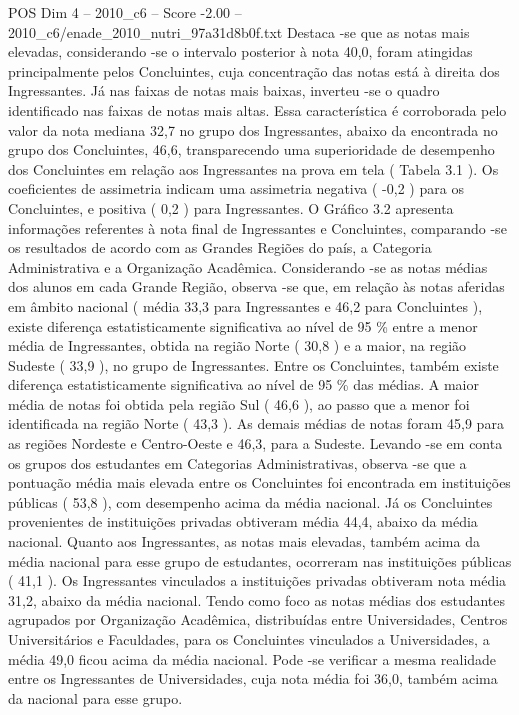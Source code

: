 \begin{textsample}{POS Dim 4 – 2010\_c6 – Score -2.00 – 2010\_c6/enade\_2010\_nutri\_97a31d8b0f.txt}
Destaca -se que as notas mais elevadas, considerando -se o intervalo posterior à nota 40,0, foram atingidas principalmente pelos Concluintes, cuja concentração das notas está à direita dos Ingressantes.
Já nas faixas de notas mais baixas, inverteu -se o quadro identificado nas faixas de notas mais altas.
Essa característica é corroborada pelo valor da nota mediana 32,7 no grupo dos Ingressantes, abaixo da encontrada no grupo dos Concluintes, 46,6, transparecendo uma superioridade de desempenho dos Concluintes em relação aos Ingressantes na prova em tela ( Tabela 3.1 ).
Os coeficientes de assimetria indicam uma assimetria negativa ( -0,2 ) para os Concluintes, e positiva ( 0,2 ) para Ingressantes.
O Gráfico 3.2 apresenta informações referentes à nota final de Ingressantes e Concluintes, comparando -se os resultados de acordo com as Grandes Regiões do país, a Categoria Administrativa e a Organização Acadêmica.
Considerando -se as notas médias dos alunos em cada Grande Região, observa -se que, em relação às notas aferidas em âmbito nacional ( média 33,3 para Ingressantes e 46,2 para Concluintes ), existe diferença estatisticamente significativa ao nível de 95 \% entre a menor média de Ingressantes, obtida na região Norte ( 30,8 ) e a maior, na região Sudeste ( 33,9 ), no grupo de Ingressantes.
Entre os Concluintes, também existe diferença estatisticamente significativa ao nível de 95 \% das médias.
A maior média de notas foi obtida pela região Sul ( 46,6 ), ao passo que a menor foi identificada na região Norte ( 43,3 ).
As demais médias de notas foram 45,9 para as regiões Nordeste e Centro-Oeste e 46,3, para a Sudeste.
Levando -se em conta os grupos dos estudantes em Categorias Administrativas, observa -se que a pontuação média mais elevada entre os Concluintes foi encontrada em instituições públicas ( 53,8 ), com desempenho acima da média nacional.
Já os Concluintes provenientes de instituições privadas obtiveram média 44,4, abaixo da média nacional.
Quanto aos Ingressantes, as notas mais elevadas, também acima da média nacional para esse grupo de estudantes, ocorreram nas instituições públicas ( 41,1 ).
Os Ingressantes vinculados a instituições privadas obtiveram nota média 31,2, abaixo da média nacional.
Tendo como foco as notas médias dos estudantes agrupados por Organização Acadêmica, distribuídas entre Universidades, Centros Universitários e Faculdades, para os Concluintes vinculados a Universidades, a média 49,0 ficou acima da média nacional.
Pode -se verificar a mesma realidade entre os Ingressantes de Universidades, cuja nota média foi 36,0, também acima da nacional para esse grupo.

\end{textsample}
